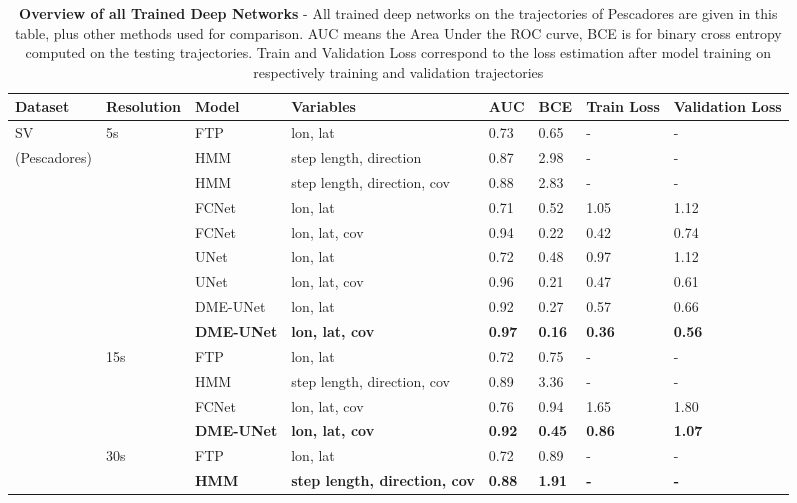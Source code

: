 \documentclass{article}
\begin{document}
\begin{table}[h]
 \caption{\textbf{Overview of all Trained Deep Networks} - All trained deep networks on the trajectories of Pescadores are given in this table, plus other methods used for comparison. AUC means the Area Under the ROC curve, BCE is for binary cross entropy computed on the testing trajectories. Train and Validation Loss correspond to the loss estimation after model training on respectively training and validation trajectories}
  \centering
  \begin{tabular}{llllllll}
    \toprule
    Dataset  &  Resolution &  Model & Variables & AUC & BCE & Train Loss & Validation Loss \\
    \midrule
    SV       & 5s  & FTP    & lon, lat               & 0.73 & 0.65 & - & -     \\
(Pescadores) &     & HMM    & step length, direction & 0.87 & 2.98 & - & -     \\
            &     & HMM    & step length, direction, cov & 0.88 & 2.83 & - & - \\
             &     & FCNet  & lon, lat               & 0.71 & 0.52 & 1.05 & 1.12 \\
             &     & FCNet  & lon, lat, cov          & 0.94 & 0.22 & 0.42 & 0.74  \\
             &     & UNet   & lon, lat               & 0.72 & 0.48 & 0.97 & 1.12  \\
             &     & UNet   & lon, lat, cov          & 0.96 & 0.21 & 0.47 & 0.61  \\
             &     & DME-UNet   & lon, lat   & 0.92 & 0.27 & 0.57 & 0.66  \\
             &     & \textbf{DME-UNet}   & \textbf{lon, lat, cov}  & \textbf{0.97} & \textbf{0.16} & \textbf{0.36} & \textbf{0.56}  \\
             & 15s & FTP    & lon, lat               & 0.72 & 0.75 & - & -      \\
             &     & HMM    & step length, direction, cov & 0.89 & 3.36 & - & -       \\
             &     & FCNet  & lon, lat, cov          & 0.76 & 0.94 & 1.65 & 1.80 \\
             &     & \textbf{DME-UNet}   & \textbf{lon, lat, cov}  & \textbf{0.92} & \textbf{0.45} & \textbf{0.86} & \textbf{1.07}  \\
             & 30s & FTP    & lon, lat               & 0.72 & 0.89 & - & -      \\
             &     & \textbf{HMM}    & \textbf{step length, direction, cov} & \textbf{0.88} & \textbf{1.91} & \textbf{-} & \textbf{-}       \\

\end{tabular}
\end{table}
\end{document}
